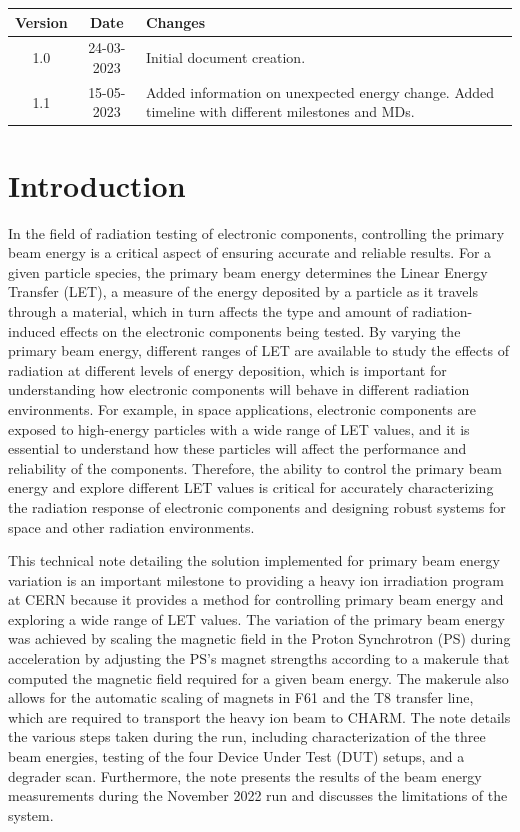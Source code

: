 \documentclass{cernatsnote}
\begin{document}
\noindent
\begin{tabularx}{\textwidth}{|c|c|X|}
\hline
\textbf{Version} & \textbf{Date} & \textbf{Changes} \\
\hline
1.0 & 24-03-2023 & Initial document creation. \\
\hline
1.1 & 15-05-2023 &  Added information on unexpected energy change. Added timeline with different milestones and MDs.\\
\hline
\end{tabularx}

\newpage

\section{Introduction}
In the field of radiation testing of electronic components, controlling the primary beam energy is a critical aspect of ensuring accurate and reliable results. For a given particle species, the primary beam energy determines the Linear Energy Transfer (LET), a measure of the energy deposited by a particle as it travels through a material, which in turn affects the type and amount of radiation-induced effects on the electronic components being tested. By varying the primary beam energy, different ranges of LET are available to study the effects of radiation at different levels of energy deposition, which is important for understanding how electronic components will behave in different radiation environments. For example, in space applications, electronic components are exposed to high-energy particles with a wide range of LET values, and it is essential to understand how these particles will affect the performance and reliability of the components. Therefore, the ability to control the primary beam energy and explore different LET values is critical for accurately characterizing the radiation response of electronic components and designing robust systems for space and other radiation environments.

This technical note detailing the solution implemented for primary beam energy variation is an important milestone to providing a heavy ion irradiation program at CERN because it provides a method for controlling primary beam energy and exploring a wide range of LET values. The variation of the primary beam energy was achieved by scaling the magnetic field in the Proton Synchrotron (PS) during acceleration by adjusting the PS's magnet strengths according to a makerule that computed the magnetic field required for a given beam energy. The makerule also allows for the automatic scaling of magnets in F61 and the T8 transfer line, which are required to transport the heavy ion beam to CHARM. The note details the various steps taken during the run, including characterization of the three beam energies, testing of the four Device Under Test (DUT) setups, and a degrader scan. Furthermore, the note presents the results of the beam energy measurements during the November 2022 run and discusses the limitations of the system.
\end{document}
